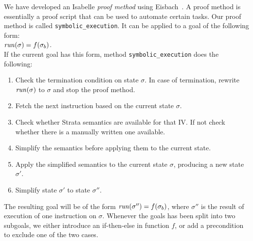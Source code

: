 We have developed an Isabelle \emph{proof method} using Eisbach~\cite{matichuk2016eisbach}.
A proof method is essentially a proof script that can be used to automate certain tasks.
Our proof method is called \texttt{symbolic\_execution}.
It can be applied to a goal of the following form:
\\[1em]
  \mbox{\hspace{5ex}} $\mathit{run}(\sigma) = f(\sigma_b)$.
\\[1em]
If the current goal has this form, method \texttt{symbolic\_execution} does the following:
\begin{enumerate}
\item Check the termination condition on state $\sigma$. In case of termination, rewrite $\mathit{run}(\sigma)$ to $\sigma$ and stop the proof method.
\item Fetch the next instruction based on the current state $\sigma$.
\item Check whether Strata semantics are available for that IV. If not check whether there is a manually written one available.
\item Simplify the semantics before applying them to the current state.\label{step_small_step}
\item Apply the simplified semantics to the current state $\sigma$, producing a new state $\sigma'$.
\item Simplify state $\sigma'$ to state $\sigma''$.\label{step_simplify}
\end{enumerate}
The resulting goal will be of the form $\mathit{run}(\sigma'') = f(\sigma_b)$, where $\sigma''$ is the result of execution of one instruction on $\sigma$.
Whenever the goals has been split into two subgoals, we either introduce an if-then-else in function $f$, or add a precondition to exclude one of the two cases.


